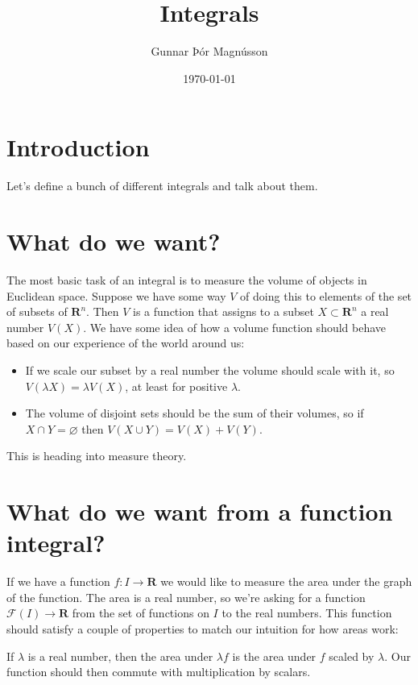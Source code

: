 \documentclass[11pt]{amsart}
\author{Gunnar Þór Magnússon}
\date{\today}
\title{Integrals}
\theoremstyle{definition}
\newcommand{\cc}[1]{\mathcal{#1}}
\def\empty{\varnothing}
\def\RR{\mathbf{R}}
\begin{document}
\maketitle


\section*{Introduction}

Let's define a bunch of different integrals and talk about them.


\section{What do we want?}

The most basic task of an integral is to measure the volume of objects in Euclidean space.
Suppose we have some way $V$ of doing this to elements of the set of subsets of $\RR^n$.
Then $V$ is a function that assigns to a subset $X \subset \RR^n$ a real number $V(X)$.
We have some idea of how a volume function should behave based on our experience of the world around us:
\begin{itemize}
\item
If we scale our subset by a real number the volume should scale with it, so $V(\lambda X) = \lambda V(X)$, at least for positive $\lambda$.

\item
The volume of disjoint sets should be the sum of their volumes, so if $X \cap Y = \empty$ then $V(X \cup Y) = V(X) + V(Y)$.
\end{itemize}

This is heading into measure theory.


\section{What do we want from a function integral?}

If we have a function $f : I \to \RR$ we would like to measure the area under the graph of the function.
The area is a real number, so we're asking for a function $\cc F(I) \to \RR$ from the set of functions on $I$ to the real numbers.
This function should satisfy a couple of properties to match our intuition for how areas work:

If $\lambda$ is a real number, then the area under $\lambda f$ is the area under $f$ scaled by $\lambda$.
Our function should then commute with multiplication by scalars.
\end{document}
